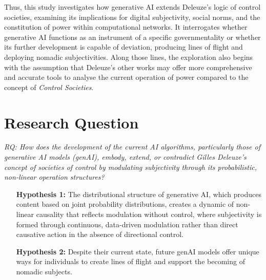 Thus, this study investigates how generative AI extends Deleuze’s logic of control societies, examining its implications for digital subjectivity, social norms, and the constitution of power within computational networks. It interrogates whether generative AI functions as an instrument of a specific governmentality or whether its further development is capable of deviation, producing lines of flight and deploying nomadic subjectivities. Along those lines, the exploration also begins with the assumption that Deleuze’s other works  may offer more comprehensive and accurate tools to analyse the current operation of power compared to the concept of \textit{Control Societies}.

\section{Research Question}

\begin{center}

	\textit{RQ: How does the development of the current AI algorithms, particularly those of generative AI models (genAI), embody, extend, or contradict Gilles Deleuze’s concept of societies of control by modulating subjectivity through its probabilistic, non-linear operation structures?}
\end{center}

\begin{itemize}
	\item [\textbf{Hypothesis 1:}] The distributional structure of generative AI, which produces content based on joint probability distributions, creates a dynamic of non-linear causality that reflects modulation without control, where subjectivity is formed through continuous, data-driven modulation rather than direct causative action in the absence of directional control. 
	\item [\textbf{Hypothesis 2:}] Despite their current state, future genAI models
	      offer unique ways for individuals to create lines of
	      flight and support the becoming of nomadic subjects. 
\end{itemize}

